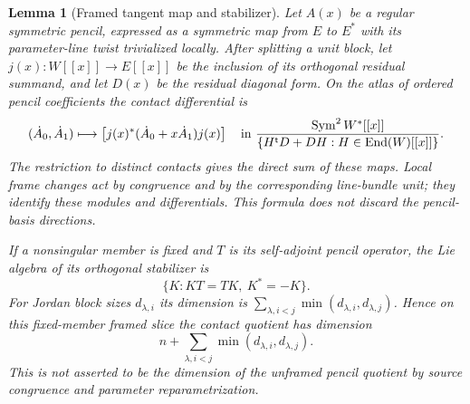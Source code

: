 \documentclass[11pt,reqno]{amsart}
\numberwithin{equation}{section}
\newtheorem{lemma}[theorem]{Lemma}
\theoremstyle{definition}\newtheorem{definition}[theorem]{Definition}
\theoremstyle{remark}\newtheorem{remark}[theorem]{Remark}
\DeclareMathOperator{\Sym}{Sym}\DeclareMathOperator{\Gr}{Gr}
\begin{document}
\begin{lemma}[Framed tangent map and stabilizer]
\label{lem:framed-tangent-v163}
Let $A(x)$ be a regular symmetric pencil, expressed as a symmetric map
from $E$ to $E^*$ with its parameter-line twist trivialized locally.
After splitting a unit block, let $j(x):W[[x]]\to E[[x]]$ be the
inclusion of its orthogonal residual summand, and let $D(x)$ be the
residual diagonal form. On the atlas of ordered pencil coefficients
the contact differential is
\begin{equation}\label{eq:contact-differential-v163}
 (\dot A_0,\dot A_1)\longmapsto
 \left[j(x)^*(\dot A_0+x\dot A_1)j(x)\right]
 \quad\hbox{in }\frac{\Sym^2W^*[[x]]}
 {\{H^{\mathsf t}D+DH:H\in\operatorname{End}(W)[[x]]\}}.
\end{equation}
The restriction to distinct contacts gives the direct sum of these
maps. Local frame changes act by congruence and by the corresponding
line-bundle unit; they identify these modules and differentials.
This formula does not discard the pencil-basis directions.

If a nonsingular member is fixed and $T$ is its self-adjoint pencil
operator, the Lie algebra of its orthogonal stabilizer is
\[
        \{K:KT=TK,\ K^*=-K\}.
\]
For Jordan block sizes $d_{\lambda,i}$ its dimension is
$\sum_{\lambda,i<j}\min(d_{\lambda,i},d_{\lambda,j})$. Hence on
this fixed-member framed slice the contact quotient has dimension
\[
 n+\sum_{\lambda,i<j}\min(d_{\lambda,i},d_{\lambda,j}).
\]
This is not asserted to be the dimension of the unframed pencil
quotient by source congruence and parameter reparametrization.
\end{lemma}
\end{document}
